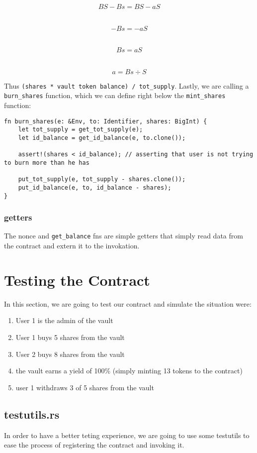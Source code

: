 \documentclass{article}
\newcommand{\inl}[1]{\lstinline{#1}}
\begin{document}
\[ BS - Bs = BS - aS \]
\

\[ - Bs = - aS \]
\

\[ Bs = aS \]
\

\[ a = Bs \div S \]

Thus \inl{(shares * vault token balance) / tot_supply}. Lastly, we are calling a \inl{burn_shares} function, which we can define right below the \inl{mint_shares} function:

\begin{lstlisting}
fn burn_shares(e: &Env, to: Identifier, shares: BigInt) {
    let tot_supply = get_tot_supply(e);
    let id_balance = get_id_balance(e, to.clone());

    assert!(shares < id_balance); // asserting that user is not trying to burn more than he has

    put_tot_supply(e, tot_supply - shares.clone());
    put_id_balance(e, to, id_balance - shares);
}

\end{lstlisting}

\subsubsection{getters}
The nonce and \inl{get_balance} fns are simple getters that simply read data from the contract and extern it to the invokation.

\section{Testing the Contract}
In this section, we are going to test our contract and simulate the situation were:
\begin{enumerate}
\item User 1 is the admin of the vault
\item User 1 buys 5 shares from the vault
\item User 2 buys 8 shares from the vault
\item the vault earns a yield of 100\% (simply minting 13 tokens to the contract)
\item user 1 withdraws 3 of 5 shares from the vault
\end{enumerate}

\subsection{testutils.rs}
In order to have a better teting experience, we are going to use some testutils to ease the process of registering the contract and invoking it.
\end{document}
